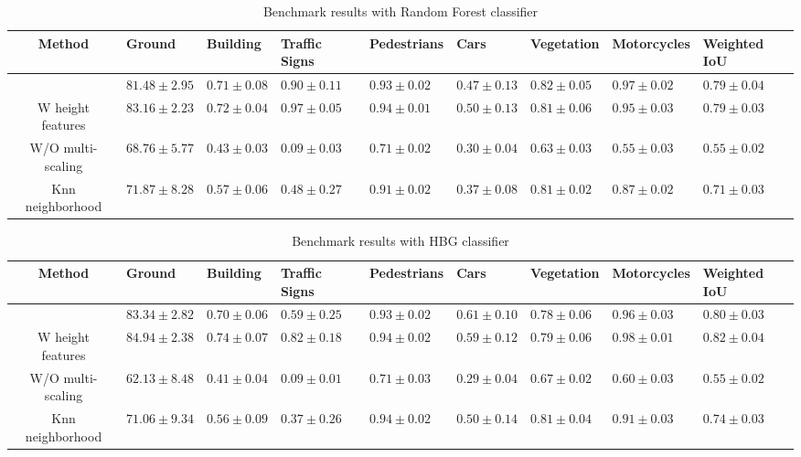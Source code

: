 \documentclass{article}
\begin{document}
\begin{table}
    \hspace*{-3.5cm}
    \begin{tabular}{cllllllll}
            Method & Ground & Building & Traffic Signs & Pedestrians & Cars & Vegetation & Motorcycles & Weighted IoU \\
            \hline
            \cite{thomas_semantic_2018} & $81.48 \pm 2.95$ & $0.71 \pm 0.08$ & $0.90 \pm 0.11$ & $0.93 \pm 0.02$ & $0.47 \pm 0.13$ & $0.82 \pm 0.05$ & $0.97 \pm 0.02$ & $0.79 \pm 0.04$ \\
            W height features & $83.16 \pm 2.23$ & $0.72 \pm 0.04$ & $0.97 \pm 0.05$ & $0.94 \pm 0.01$ & $0.50 \pm 0.13$ & $0.81 \pm 0.06$ & $0.95 \pm 0.03$ & $0.79 \pm 0.03$ \\
            W/O multi-scaling & $68.76 \pm 5.77$ & $0.43 \pm 0.03$ & $0.09 \pm 0.03$ & $0.71 \pm 0.02$ & $0.30 \pm 0.04$ & $0.63 \pm 0.03$ & $0.55 \pm 0.03$ & $0.55 \pm 0.02$ \\
            Knn neighborhood  & $71.87 \pm 8.28$ & $0.57 \pm 0.06$ & $0.48 \pm 0.27$ & $0.91 \pm 0.02$ & $0.37 \pm 0.08$ & $0.81 \pm 0.02$ & $0.87 \pm 0.02$ & $0.71 \pm 0.03$ \\
    \end{tabular}

    \caption{Benchmark results with Random Forest classifier}
    \label{tab:benchmark_RF}
\end{table}
\begin{table}
    \hspace*{-3.5cm}
    \begin{tabular}{cllllllll}
            Method & Ground & Building & Traffic Signs & Pedestrians & Cars & Vegetation & Motorcycles & Weighted IoU \\
            \hline
            \cite{thomas_semantic_2018} & $83.34 \pm 2.82$ & $0.70 \pm 0.06$ & $0.59 \pm 0.25$ & $0.93 \pm 0.02$ & $0.61 \pm 0.10$ & $0.78 \pm 0.06$ & $0.96 \pm 0.03$ & $0.80 \pm 0.03$ \\
            W height features & $84.94 \pm 2.38$ & $0.74 \pm 0.07$ & $0.82 \pm 0.18$ & $0.94 \pm 0.02$ & $0.59 \pm 0.12$ & $0.79 \pm 0.06$ & $0.98 \pm 0.01$ & $0.82 \pm 0.04$ \\
            W/O multi-scaling & $62.13 \pm 8.48$ & $0.41 \pm 0.04$ & $0.09 \pm 0.01$ & $0.71 \pm 0.03$ & $0.29 \pm 0.04$ & $0.67 \pm 0.02$ & $0.60 \pm 0.03$ & $0.55 \pm 0.02$ \\
            Knn neighborhood & $71.06 \pm 9.34$ & $0.56 \pm 0.09$ & $0.37 \pm 0.26$ & $0.94 \pm 0.02$ & $0.50 \pm 0.14$ & $0.81 \pm 0.04$ & $0.91 \pm 0.03$ & $0.74 \pm 0.03$ \\
    \end{tabular}
    \caption{Benchmark results with HBG classifier}
    \label{tab:benchmark_Boosting}
\end{table}
\end{document}
